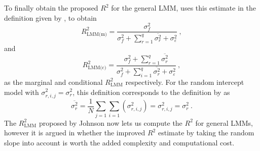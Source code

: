 To finally obtain the proposed $R^2$ for the general LMM, \citet{Johnson2014} uses this estimate in the definition given by \citet{nakagawa2013general}, to obtain
\begin{equation}
    R^2_{\text{LMM(m)}} = \frac{\sigma^2_f}{\sigma^2_f + \sum_{r=1}^{q}\overline{\sigma^2_{r}} + \sigma^2_{\varepsilon}} \ ,
\end{equation}
and 
\begin{equation}
    R^2_{\text{LMM(c)}} = \frac{\sigma^2_f + \sum_{r=1}^{q}\overline{\sigma^2_{r}}}{\sigma^2_f + \sum_{i=1}^{q}\overline{\sigma^2_{r}} + \sigma^2_{\varepsilon}} \ ,
\end{equation}
as the marginal and conditional $R^2_{\text{LMM}}$ respectively. 
For the random intercept model with $\sigma_{r, i, j}^2 = \sigma^2_r$, this definition corresponds to the definition by \citet{nakagawa2013general} as 
\begin{equation}
    \overline{\sigma^2_{r}} = \frac{1}{N}\sum_{j=1}\sum_{i=1} \left(\sigma^2_{r, i, j} \right) = \sigma^2_{r, i, j}  = \sigma^2_{r} \ .
\end{equation}
The $R^2_{\text{LMM}}$ proposed by Johnson now lets us compute the $R^2$ for general LMMs, however it is argued in \citet{Johnson2014} whether the improved $R^2$ estimate by taking the random slope into account is worth the added complexity and computational cost.

